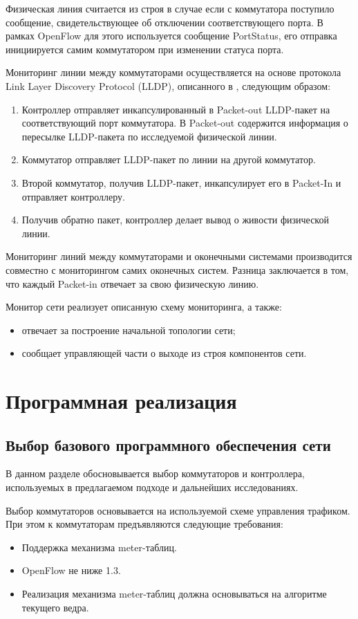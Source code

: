 \documentclass[12pt, a4paper]{article}
\begin{document}
Физическая линия считается из строя в случае если с коммутатора поступило сообщение, свидетельствующее об отключении соответствующего порта. В рамках OpenFlow для этого используется сообщение PortStatus, его отправка инициируется самим коммутатором при изменении статуса порта.

Мониторинг линии между коммутаторами осуществляется на основе протокола Link Layer Discovery Protocol (LLDP), описанного в \cite{monitor2}, следующим образом:
\begin{enumerate}
	\item Контроллер отправляет инкапсулированный в Packet-out LLDP-пакет на соответствующий порт коммутатора. В Packet-out содержится информация о пересылке LLDP-пакета по исследуемой физической линии.
	\item Коммутатор отправляет LLDP-пакет по линии на другой коммутатор.
	\item Второй коммутатор, получив LLDP-пакет, инкапсулирует его в Packet-In и отправляет контроллеру.
	\item Получив обратно пакет, контроллер делает вывод о живости физической линии.
\end{enumerate}

Мониторинг линий между коммутаторами и оконечными системами производится совместно с мониторингом самих оконечных систем. Разница заключается в том, что каждый Packet-in отвечает за свою физическую линию.

Монитор сети реализует описанную схему мониторинга, а также:
\begin{itemize}
	\item отвечает за построение начальной топологии сети;
	\item сообщает управляющей части о выходе из строя компонентов сети.
\end{itemize}

\section{Программная реализация}
\subsection{Выбор базового программного обеспечения сети}

В данном разделе обосновывается выбор коммутаторов и контроллера, используемых в предлагаемом подходе и дальнейших исследованиях.

Выбор коммутаторов основывается на используемой схеме управления трафиком. При этом к коммутаторам предъявляются следующие требования:
\begin{itemize}
	\item Поддержка механизма meter-таблиц.
	\item OpenFlow не ниже 1.3.
	\item Реализация механизма meter-таблиц должна основываться на алгоритме текущего ведра.
\end{itemize}
\end{document}
